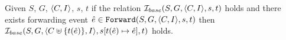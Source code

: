 \documentclass[12pt]{article}
\begin{document}

\begin{lemma}
  \label{lemma:sim-basic}
  Given $S$, $G$, $\langle C, I \rangle$, $s$, $t$
  if the relation $\mathcal{I}_{base}(S, G, \langle C, I \rangle, s, t)$ holds and 
  there exists forwarding event $\hat{e} \in {\mathtt{Forward}}(S, G, \langle C, I \rangle, s, t)$
  then $\mathcal{I}_{base}(S, G, \langle C \uplus \{t(\hat{e})\}, I \rangle, s[t(\hat{e}) \mapsto \hat{e}], t)$ holds. 
\end{lemma}
\end{document}
